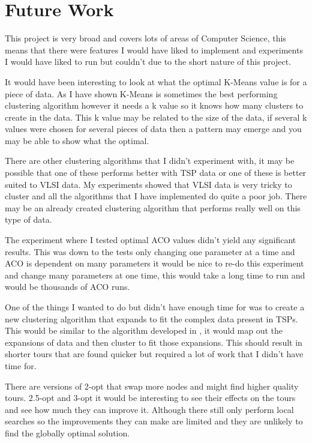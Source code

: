 \section{Future Work}

This project is very broad and covers lots of areas of Computer Science, this means that there were features I would have liked to implement and experiments I would have liked to run but couldn't due to the short nature of this project.

It would have been interesting to look at what the optimal K-Means value is for a piece of data. As I have shown K-Means is sometimes the best performing clustering algorithm however it needs a k value so it knows how many clusters to create in the data. This k value may be related to the size of the data, if several k values were chosen for several pieces of data then a pattern may emerge and you may be able to show what the optimal.

There are other clustering algorithms that I didn't experiment with, it may be possible that one of these performs better with TSP data or one of these is better suited to VLSI data. My experiments showed that VLSI data is very tricky to cluster and all the algorithms that I have implemented do quite a poor job. There may be an already created clustering algorithm that performs really well on this type of data.

The experiment where I tested optimal ACO values didn't yield any significant results. This was down to the tests only changing one parameter at a time and ACO is dependent on many parameters it would be nice to re-do this experiment and change many parameters at one time, this would take a long time to run and would be thousands of ACO runs.

One of the things I wanted to do but didn't have enough time for was to create a new clustering algorithm that expands to fit the complex data present in TSPs. This would be similar to the algorithm developed in \cite{pang_chao-yang_ben-qiong_zhang_jie_wei_shan_zheng-chao_2014}, it would map out the expansions of data and then cluster to fit those expansions. This should result in shorter tours that are found quicker but required a lot of work that I didn't have time for.

There are versions of 2-opt that swap more nodes and might find higher quality tours. 2.5-opt and 3-opt it would be interesting to see their effects on the tours and see how much they can improve it. Although there still only perform local searches so the improvements they can make are limited and they are unlikely to find the globally optimal solution. 

